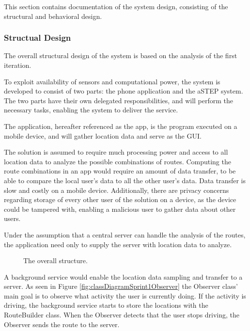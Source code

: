 This section contains documentation of the system design, consisting of the structural and behavioral design.

\subsubsection{Structual Design}
The overall structural design of the system is based on the analysis of the first iteration.

To exploit availability of sensors and computational power, the system is developed to consist of two parts: the phone application and the aSTEP system.
The two parts have their own delegated responsibilities, and will perform the necessary tasks, enabling the system to deliver the service.

The application, hereafter referenced as the app, is the program executed on a mobile device, and will gather location data and serve as the GUI. 

The solution is assumed to require much processing power and access to all location data to analyze the possible combinations of routes.
Computing the route combinations in an app would require an amount of data transfer, to be able to compare the local user's data to all the other user's data.
Data transfer is slow and costly on a mobile device.
Additionally, there are privacy concerns regarding storage of every other user of the solution on a device, as the device could be tampered with, enabling a malicious user to gather data about other users. 

Under the assumption that a central server can handle the analysis of the routes, the application need only to supply the server with location data to analyze.

\begin{figure}[h]
	\centering
	
	\caption{The overall structure.}
	\label{fig:packageDiagramSprint1}
\end{figure}

A background service would enable the location data sampling and transfer to a server.
As seen in Figure \ref{fig:classDiagramSprint1Observer} the Observer class' main goal is to observe what activity the user is currently doing.
If the activity is driving, the background service starts to store the locations with the RouteBuilder class.
When the Observer detects that the user stops driving, the Observer sends the route to the server.

